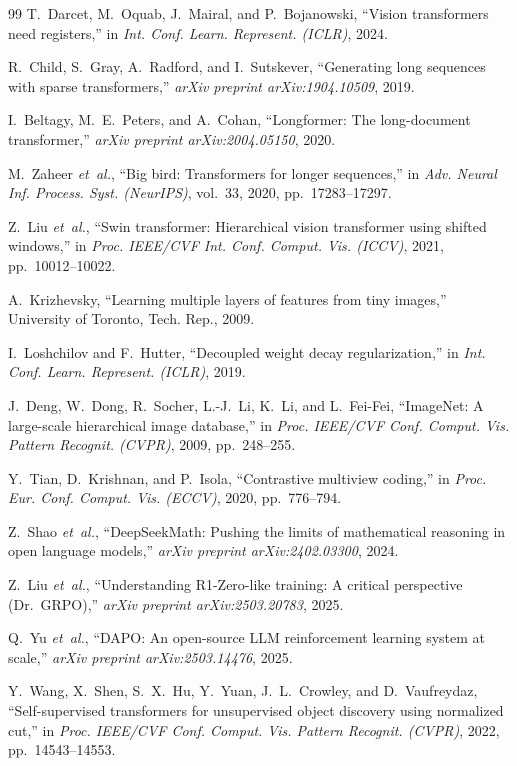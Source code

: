 \documentclass[11pt,a4paper]{article}
\begin{document}
\begin{thebibliography}{99}
T.~Darcet, M.~Oquab, J.~Mairal, and P.~Bojanowski,
``Vision transformers need registers,''
in \emph{Int. Conf. Learn. Represent. (ICLR)}, 2024.

R.~Child, S.~Gray, A.~Radford, and I.~Sutskever,
``Generating long sequences with sparse transformers,''
\emph{arXiv preprint arXiv:1904.10509}, 2019.

I.~Beltagy, M.~E.~Peters, and A.~Cohan,
``Longformer: The long-document transformer,''
\emph{arXiv preprint arXiv:2004.05150}, 2020.

M.~Zaheer \emph{et~al.},
``Big bird: Transformers for longer sequences,''
in \emph{Adv. Neural Inf. Process. Syst. (NeurIPS)}, vol.~33, 2020, pp.~17283--17297.

Z.~Liu \emph{et~al.},
``Swin transformer: Hierarchical vision transformer using shifted windows,''
in \emph{Proc. IEEE/CVF Int. Conf. Comput. Vis. (ICCV)}, 2021, pp.~10012--10022.

A.~Krizhevsky,
``Learning multiple layers of features from tiny images,''
University of Toronto, Tech. Rep., 2009.

I.~Loshchilov and F.~Hutter,
``Decoupled weight decay regularization,''
in \emph{Int. Conf. Learn. Represent. (ICLR)}, 2019.

J.~Deng, W.~Dong, R.~Socher, L.-J.~Li, K.~Li, and L.~Fei-Fei,
``ImageNet: A large-scale hierarchical image database,''
in \emph{Proc. IEEE/CVF Conf. Comput. Vis. Pattern Recognit. (CVPR)}, 2009, pp.~248--255.

Y.~Tian, D.~Krishnan, and P.~Isola,
``Contrastive multiview coding,''
in \emph{Proc. Eur. Conf. Comput. Vis. (ECCV)}, 2020, pp.~776--794.

Z.~Shao \emph{et~al.},
``DeepSeekMath: Pushing the limits of mathematical reasoning in open language models,''
\emph{arXiv preprint arXiv:2402.03300}, 2024.

Z.~Liu \emph{et~al.},
``Understanding R1-Zero-like training: A critical perspective (Dr.\ GRPO),''
\emph{arXiv preprint arXiv:2503.20783}, 2025.

Q.~Yu \emph{et~al.},
``DAPO: An open-source LLM reinforcement learning system at scale,''
\emph{arXiv preprint arXiv:2503.14476}, 2025.

Y.~Wang, X.~Shen, S.~X.~Hu, Y.~Yuan, J.~L.~Crowley, and D.~Vaufreydaz,
``Self-supervised transformers for unsupervised object discovery using normalized cut,''
in \emph{Proc. IEEE/CVF Conf. Comput. Vis. Pattern Recognit. (CVPR)}, 2022, pp.~14543--14553.

\end{thebibliography}
\end{document}
